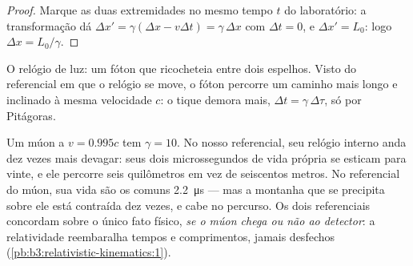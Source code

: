 \begin{proof}
Marque as duas extremidades no mesmo tempo $t$ do laboratório: a
transformação dá $\Delta x' = \gamma(\Delta x - v\Delta t) = \gamma\,\Delta x$
com $\Delta t = 0$, e $\Delta x' = L_0$: logo $\Delta x = L_0/\gamma$.
\end{proof}

\begin{omfigure}

{\small O relógio de luz: um fóton que ricocheteia entre dois espelhos.
Visto do referencial em que o relógio se move, o fóton percorre um
caminho mais longo e inclinado à mesma velocidade $c$: o tique demora
mais, $\Delta t = \gamma\,\Delta\tau$, só por Pitágoras.}
\end{omfigure}

\begin{example}\label{ex:b3:relativistic-kinematics:muon}
Um múon a $v = 0.995c$ tem $\gamma = 10$. No nosso referencial, seu
relógio interno anda dez vezes mais devagar: seus dois microssegundos
de vida própria se esticam para vinte, e ele percorre seis quilômetros
em vez de seiscentos metros. No referencial do múon, sua vida são os
comuns \qty{2.2}{\micro s} --- mas a montanha que se precipita sobre
ele está contraída dez vezes, e cabe no percurso. Os dois referenciais
concordam sobre o único fato físico, \emph{se o múon chega ou não ao
detector}: a relatividade reembaralha tempos e comprimentos, jamais
desfechos (\cref{pb:b3:relativistic-kinematics:1}).
\end{example}

